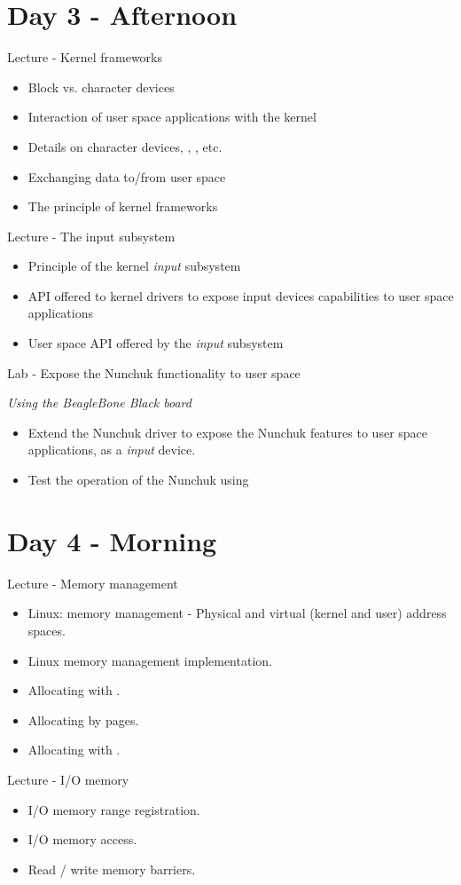 \documentclass[a4paper,12pt,obeyspaces,spaces,hyphens]{article}
\begin{document}
\section{Day 3 - Afternoon}

\feagendaonecolumn
{Lecture - Kernel frameworks}
{
  \begin{itemize}
  \item Block vs. character devices
  \item Interaction of user space applications with the kernel
  \item Details on character devices, , , etc.
  \item Exchanging data to/from user space
  \item The principle of kernel frameworks
  \end{itemize}
}

\feagendatwocolumn
{Lecture - The input subsystem}
{
  \begin{itemize}
  \item Principle of the kernel {\em input} subsystem
  \item API offered to kernel drivers to expose input devices
    capabilities to user space applications
  \item User space API offered by the {\em input} subsystem
  \end{itemize}
}
{Lab - Expose the Nunchuk functionality to user space}
{
  {\em Using the BeagleBone Black board}
  \begin{itemize}
  \item Extend the Nunchuk driver to expose the Nunchuk features to
    user space applications, as a {\em input} device.
  \item Test the operation of the Nunchuk using 
  \end{itemize}
}

\section{Day 4 - Morning}

\feagendatwocolumn
{Lecture - Memory management}
{
  \begin{itemize}
  \item Linux: memory management - Physical and virtual (kernel and user) address spaces.
  \item Linux memory management implementation.
  \item Allocating with .
  \item Allocating by pages.
  \item Allocating with .
  \end{itemize}
}
{Lecture - I/O memory}
{
  \begin{itemize}
  \item I/O memory range registration.
  \item I/O memory access.
  \item Read / write memory barriers.
  \end{itemize}
}
\end{document}
